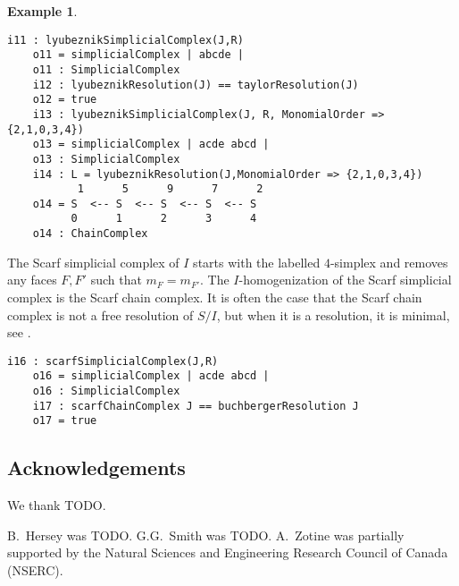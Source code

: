 \documentclass[12pt,leqno]{amsart}
\theoremstyle{definition}
\newtheorem{example}[lemma]{Example}
\begin{document}
\begin{example}
\begin{lstlisting}[basicstyle={\ttfamily \scriptsize}, xleftmargin=-23pt]
    i11 : lyubeznikSimplicialComplex(J,R)
    o11 = simplicialComplex | abcde |
    o11 : SimplicialComplex
    i12 : lyubeznikResolution(J) == taylorResolution(J)
    o12 = true
    i13 : lyubeznikSimplicialComplex(J, R, MonomialOrder => {2,1,0,3,4})
    o13 = simplicialComplex | acde abcd |
    o13 : SimplicialComplex
    i14 : L = lyubeznikResolution(J,MonomialOrder => {2,1,0,3,4})
           1      5      9      7      2
    o14 = S  <-- S  <-- S  <-- S  <-- S
          0      1      2      3      4
    o14 : ChainComplex
\end{lstlisting}
The Scarf simplicial complex of $I$ starts with the labelled $4$-simplex and removes any faces $F,F'$ such that $m_F = m_{F'}$. The $I$-homogenization of the Scarf simplicial complex is the Scarf chain complex. It is often the case that the Scarf chain complex is not a free resolution of $S/I$, but when it is a resolution, it is minimal, see \cite[Lemma 3.1]{BPS}.
\begin{lstlisting}[basicstyle={\ttfamily \scriptsize}, xleftmargin=-23pt]
    i16 : scarfSimplicialComplex(J,R)
    o16 = simplicialComplex | acde abcd |
    o16 : SimplicialComplex
    i17 : scarfChainComplex J == buchbergerResolution J
    o17 = true
\end{lstlisting}
\end{example}
\subsection*{Acknowledgements}
We thank TODO.
               
B.~Hersey was TODO. G.G.~Smith was TODO. A.~Zotine was partially supported by the Natural Sciences and Engineering Research Council of Canada (NSERC).
\end{document}
